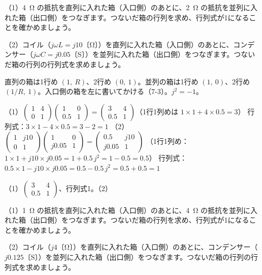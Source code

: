 \begin{reidai}[電気の箱の行列式は1]
（1）\qty{4}{\ohm} の抵抗を直列に入れた箱（入口側）のあとに、\qty{2}{\ohm} の抵抗を並列に入れた箱（出口側）をつなぎます。つないだ箱の行列を求め、行列式が1になることを確かめましょう。\par
（2）コイル（$j\omega L=j10$〔Ω〕）を直列に入れた箱（入口側）のあとに、コンデンサー（$j\omega C=j0.05$〔S〕）を並列に入れた箱（出口側）をつなぎます。つないだ箱の行列の行列式を求めましょう。\par
\kangaekata 直列の箱は1行め $(1,\ R)$、2行め $(0,\ 1)$。並列の箱は1行め $(1,\ 0)$、2行め $(1/R,\ 1)$。入口側の箱を左に書いてかける（7-3）。$j^2=-1$。\par
\shiki（1）$\begin{pmatrix}1&4\\0&1\end{pmatrix}\begin{pmatrix}1&0\\0.5&1\end{pmatrix}=\begin{pmatrix}3&4\\0.5&1\end{pmatrix}$（1行1列めは $1\times1+4\times0.5=3$）\kviieq
行列式：$3\times1-4\times0.5=3-2=1$\kviieq
（2）$\begin{pmatrix}1&j10\\0&1\end{pmatrix}\begin{pmatrix}1&0\\j0.05&1\end{pmatrix}=\begin{pmatrix}0.5&j10\\j0.05&1\end{pmatrix}$\kviieq
（1行1列め：$1\times1+j10\times j0.05=1+0.5\,j^2=1-0.5=0.5$）\kviieq
行列式：$0.5\times1-j10\times j0.05=0.5-0.5\,j^2=0.5+0.5=1$\par
\kotae（1）\nobreak $\begin{pmatrix}3&4\\0.5&1\end{pmatrix}$、行列式1。（2）
\end{reidai}

\begin{jibun}
（1）\qty{1}{\ohm} の抵抗を直列に入れた箱（入口側）のあとに、\qty{4}{\ohm} の抵抗を並列に入れた箱（出口側）をつなぎます。つないだ箱の行列を求め、行列式が1になることを確かめましょう。\par
（2）コイル（$j4$〔Ω〕）を直列に入れた箱（入口側）のあとに、コンデンサー（$j0.125$〔S〕）を並列に入れた箱（出口側）をつなぎます。つないだ箱の行列の行列式を求めましょう。
\end{jibun}

